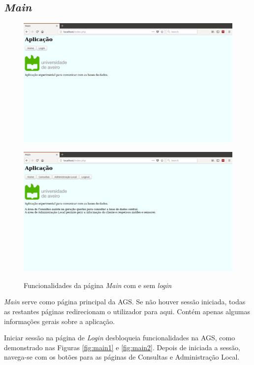 \documentclass[11pt,twoside,a4paper]{report}
\begin{document}
\subsection{\textit{Main}}
\begin{figure}[H]
\centering
	\begin{minipage}{1.\textwidth}
		\begin{center}
			\includegraphics[trim={0 11cm 0 0},clip,width=1\textwidth]{main01} %
			\label{fig:main1}
		\end{center}
	\end{minipage}
	\begin{minipage}{1.\textwidth}
		\begin{center}
			\includegraphics[trim={0 11cm 0 0},clip,width=1\textwidth]{main02} %
			\label{fig:main2}
		\end{center}
	\end{minipage}
	\caption{Funcionalidades da página \textit{Main} com e sem \textit{login}}
	\label{fig:main0}
\end{figure}
\textit{Main} serve como página principal da AGS. Se não houver sessão iniciada, todas as restantes páginas redirecionam o utilizador para aqui. Contém apenas algumas informações gerais sobre a aplicação.\par 
Iniciar sessão na página de \textit{Login} desbloqueia funcionalidades na AGS, como demonstrado nas Figuras \ref{fig:main1} e \ref{fig:main2}. Depois de iniciada a sessão, navega-se com os botões para as páginas de Consultas e Administração Local.
\end{document}
